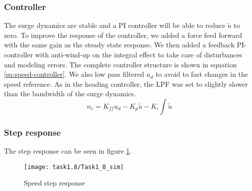 \subsubsection*{Controller}
The surge dynamics are stable and a PI controller will be able to reduce $\tilde{u}$ to zero. To improve the response of the controller, we added a force feed forward with the same gain as the steady state response. We then added a feedback PI-controller with anti-wind-up on the integral effect to take care of disturbances and modeling errors. The complete controller structure is shown in equation \ref{eq:speed-controller}. We also low pass filtered $u_d$ to avoid to fast changes in the speed reference. As in the heading controller, the LPF was set to slightly slower than the bandwidth of the surge dynamics. 
\begin{equation}
n_c = K_{ff} u_d - K_p \tilde{u} - K_i \int \tilde{u}
\label{eq:speed-controller}
\end{equation}

\subsubsection*{Step response}
The step response can be seen in figure \ref{fig:1.8-step}.
\begin{figure}[H]
    \centering
    \texttt{[image: task1.8/Task1\_8\_sim]}
    \caption{Speed step response}
    \label{fig:1.8-step}
\end{figure}